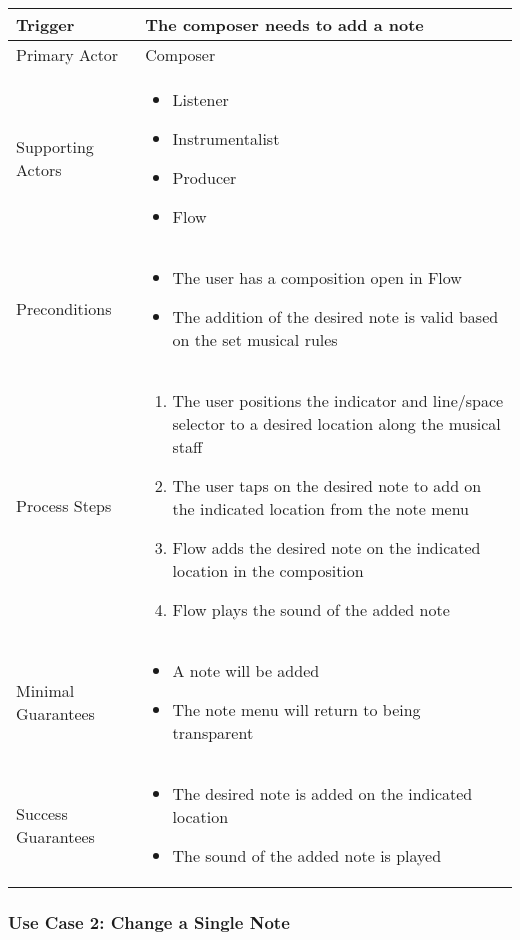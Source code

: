 \begin{tabularx}{\textwidth}{|X|X|}
\hline
Trigger & The composer needs to add a note \\
\hline
Primary Actor & 
Composer \\
\hline
Supporting Actors & 
\begin{itemize}
\item Listener
\item Instrumentalist
\item Producer
\item Flow
\end{itemize} \\
\hline
Preconditions & 
\begin{itemize}
\item The user has a composition open in Flow 
\item The addition of the desired note is valid based on the set musical rules
\end{itemize} \\
\hline
Process Steps & 
\begin{enumerate}
\item The user positions the indicator and line/space selector to a desired location along the musical staff
\item The user taps on the desired note to add on the indicated location from the note menu
\item Flow adds the desired note on the indicated location in the composition
\item Flow plays the sound of the added note
\end{enumerate} \\
\hline
Minimal Guarantees & 
\begin{itemize}
  \item A note will be added
  \item The note menu will return to being transparent
\end{itemize} \\
\hline
Success Guarantees & 
\begin{itemize}
\item The desired note is added on the indicated location
\item The sound of the added note is played
\end{itemize} \\
\hline
\end{tabularx}

\subsubsection{Use Case 2: Change a Single Note}

